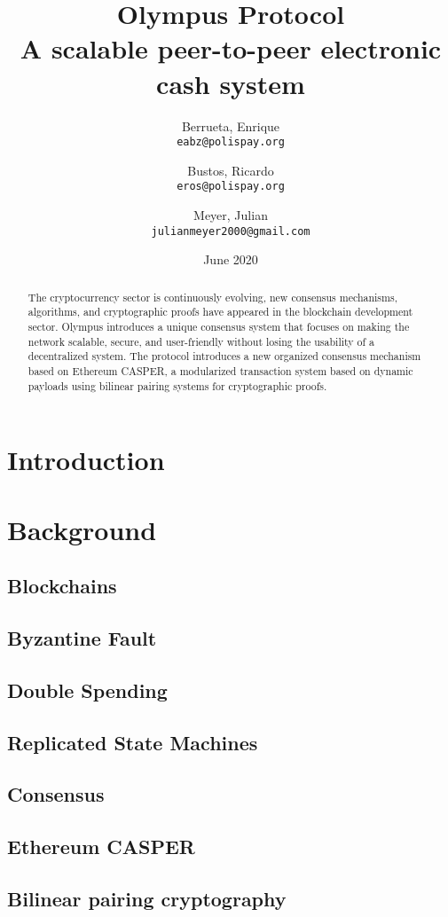 \documentclass{article}
\title{%
  Olympus Protocol \\
  \large A scalable peer-to-peer electronic cash system}
\author{
  Berrueta, Enrique\\
  \texttt{eabz@polispay.org}
  \and
  Bustos, Ricardo\\
  \texttt{eros@polispay.org}
  \and
  Meyer, Julian\\
  \texttt{julianmeyer2000@gmail.com}
}
\date{June 2020}
\begin{document}
	\maketitle
	\begin{abstract}
		The cryptocurrency sector is continuously evolving, new consensus mechanisms, algorithms, and cryptographic proofs have appeared in the blockchain development sector. Olympus introduces a unique consensus system that focuses on making the network scalable, secure, and user-friendly without losing the usability of a decentralized system. The protocol introduces a new organized consensus mechanism based on Ethereum CASPER, a modularized transaction system based on dynamic payloads using bilinear pairing systems for cryptographic proofs.
	\end{abstract}
	
	\newpage
	
    \tableofcontents		
	
	\newpage
	
	\section{Introduction}
	\section{Background}
		\subsection{Blockchains}
		\subsection{Byzantine Fault}
		\subsection{Double Spending}
		\subsection{Replicated State Machines}
		\subsection{Consensus}
		\subsection{Ethereum CASPER}
		\subsection{Bilinear pairing cryptography}
\end{document}
